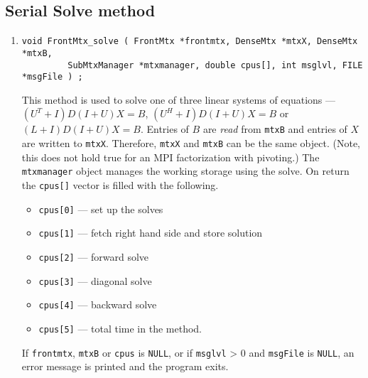 \subsection{Serial Solve method}
\label{subsection:FrontMtx:proto:solve-serial}
\par
\begin{enumerate}
\item
\begin{verbatim}
void FrontMtx_solve ( FrontMtx *frontmtx, DenseMtx *mtxX, DenseMtx *mtxB, 
         SubMtxManager *mtxmanager, double cpus[], int msglvl, FILE *msgFile ) ;
\end{verbatim}
This method is used to solve one of three linear systems of equations
---
$(U^T + I)D(I + U) X = B$,
$(U^H + I)D(I + U) X = B$ or
$(L + I)D(I + U) X = B$.
Entries of $B$ are {\it read} from {\tt mtxB} and 
entries of $X$ are written to {\tt mtxX}.
Therefore, {\tt mtxX} and {\tt mtxB} can be the same object.
(Note, this does not hold true for an MPI factorization with pivoting.)
The {\tt mtxmanager} object manages the working storage using the solve.
On return the {\tt cpus[]} vector is filled with the following.
\begin{itemize}
\item
{\tt cpus[0]} --- set up the solves
\item
{\tt cpus[1]} --- fetch right hand side and store solution
\item
{\tt cpus[2]} --- forward solve
\item
{\tt cpus[3]} --- diagonal solve
\item
{\tt cpus[4]} --- backward solve
\item
{\tt cpus[5]} --- total time in the method.
\end{itemize}
\par {}
If {\tt frontmtx}, {\tt mtxB} or {\tt cpus} 
is {\tt NULL},
or if {\tt msglvl} > 0 and {\tt msgFile} is {\tt NULL},
an error message is printed and the program exits.
\end{enumerate}
\par
